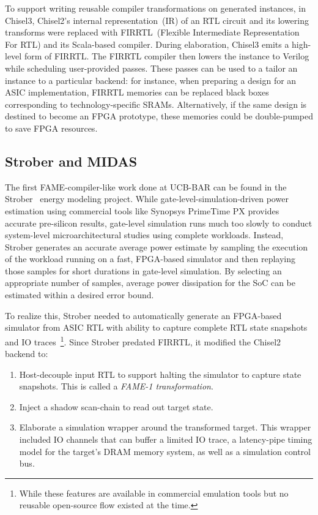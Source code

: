 To support writing reusable compiler transformations on generated instances, in
Chisel3, Chisel2's internal representation~(IR) of an RTL circuit and its
lowering transforms were replaced with FIRRTL~(Flexible Intermediate
Representation For RTL)\cite{FIRRTL} and its Scala-based compiler. During
elaboration, Chisel3 emits a high-level form of FIRRTL. The FIRRTL compiler
then lowers the instance to Verilog while scheduling user-provided passes. These passes can be used to
a tailor an instance to a particular backend: for instance, when preparing a
design for an ASIC implementation, FIRRTL memories can be replaced
black boxes corresponding to technology-specific SRAMs. Alternatively, if the same
design is destined to become an FPGA prototype, these memories could be double-pumped
to save FPGA resources.

\subsection{Strober and MIDAS}

The first FAME-compiler-like work done at UCB-BAR can be found in the
Strober~\cite{Strober} energy modeling project. While
gate-level-simulation-driven power estimation using commercial tools like
Synopsys PrimeTime PX provides accurate pre-silicon results, gate-level
simulation runs much too slowly to conduct system-level microarchitectural studies using
complete workloads. Instead, Strober generates an accurate average power
estimate by sampling the execution of the workload running on a fast,
FPGA-based simulator and then replaying those samples for short durations in
gate-level simulation. By selecting an appropriate number of samples, average
power dissipation for the SoC can be estimated within a desired error bound.

To realize this, Strober needed to automatically generate an FPGA-based
simulator from ASIC RTL with ability to capture complete RTL state snapshots
and IO traces~\footnote{While these features are available in commercial
emulation tools but no reusable open-source flow existed at the time.}.
Since Strober predated FIRRTL, it modified the Chisel2 backend to:
\begin{enumerate}
    \item Host-decouple input RTL to support halting the simulator to capture
        state snapshots. This is called a \emph{FAME-1 transformation}.
    \item Inject a shadow scan-chain to read out target state.
    \item Elaborate a simulation wrapper around the transformed target. This
        wrapper included IO channels that can buffer a limited IO trace, a
        latency-pipe timing model for the target's DRAM memory system, as well
        as a simulation control bus.
\end{enumerate}

